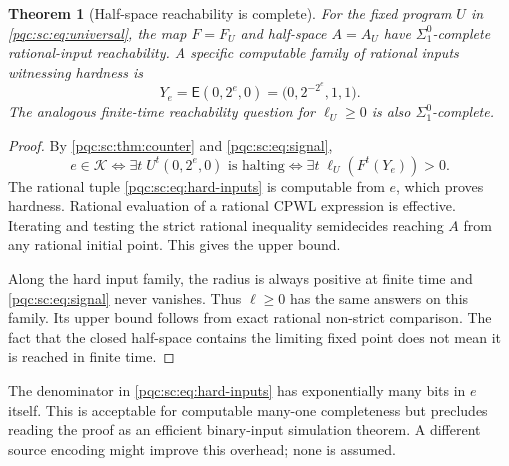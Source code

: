 \documentclass[11pt,letterpaper]{article}
\numberwithin{equation}{section}
\newtheorem{theorem}{Theorem}[section]
\theoremstyle{definition}
\theoremstyle{remark}
\newcommand{\Enc}{\mathsf E}
\begin{document}
\begin{theorem}[Half-space reachability is complete]\label{pqc:sc:thm:halfspace}
For the fixed program $U$ in \eqref{pqc:sc:eq:universal}, the map $F=F_U$ and
half-space $A=A_U$ have $\Sigma^0_1$-complete rational-input reachability.
A specific computable family of rational inputs witnessing hardness is
\begin{equation}\label{pqc:sc:eq:hard-inputs}
 Y_e=\Enc(0,2^e,0)=\bigl(0,2^{-2^e},1,1\bigr).
\end{equation}
The analogous finite-time reachability question for $\ell_U\ge0$ is also
$\Sigma^0_1$-complete.
\end{theorem}
\begin{proof}
By \cref{pqc:sc:thm:counter} and \eqref{pqc:sc:eq:signal},
\[
 e\in\mathcal K
 \iff\exists t\;U^t(0,2^e,0)\text{ is halting}
 \iff\exists t\;\ell_U(F^t(Y_e))>0.
\]
The rational tuple \eqref{pqc:sc:eq:hard-inputs} is computable from $e$, which proves
hardness. Rational evaluation of a rational CPWL expression is effective.
Iterating and testing the strict rational inequality semidecides reaching
$A$ from any rational initial point. This gives the upper bound.

Along the hard input family, the radius is always positive at finite time
and \eqref{pqc:sc:eq:signal} never vanishes. Thus $\ell\ge0$ has the same answers
on this family. Its upper bound follows from exact rational non-strict
comparison. The fact that the closed half-space contains the limiting fixed
point does not mean it is reached in finite time.
\end{proof}

The denominator in \eqref{pqc:sc:eq:hard-inputs} has exponentially many bits in
$e$ itself. This is acceptable for computable many-one completeness but
precludes reading the proof as an efficient binary-input simulation theorem.
A different source encoding might improve this overhead; none is assumed.
\end{document}
